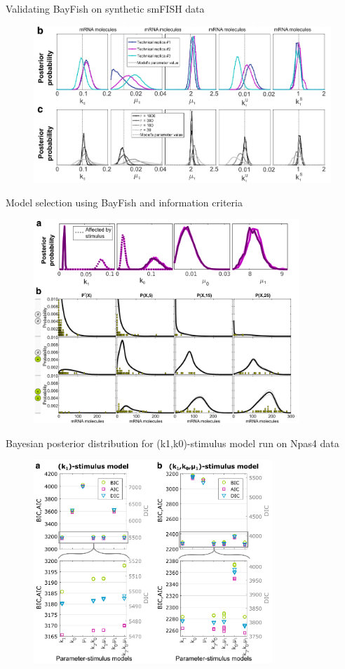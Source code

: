 \documentclass[aspectratio=1610]{beamer}					%
\begin{document}
\begin{frame}{Validating BayFish on synthetic smFISH data}

\begin{figure}
\includegraphics[width=14cm]{figure-3b.png}
\end{figure}

\end{frame}

\begin{frame}{Model selection using BayFish and information criteria}

\begin{figure}
\includegraphics[width=10cm]{figure-4.png}
\end{figure}

\end{frame}

\begin{frame}{Bayesian posterior distribution for (k1,k0)-stimulus model run on Npas4 data}

\begin{figure}
\includegraphics[width=9cm]{figure-5.png}
\end{figure}

\end{frame}
\end{document}
